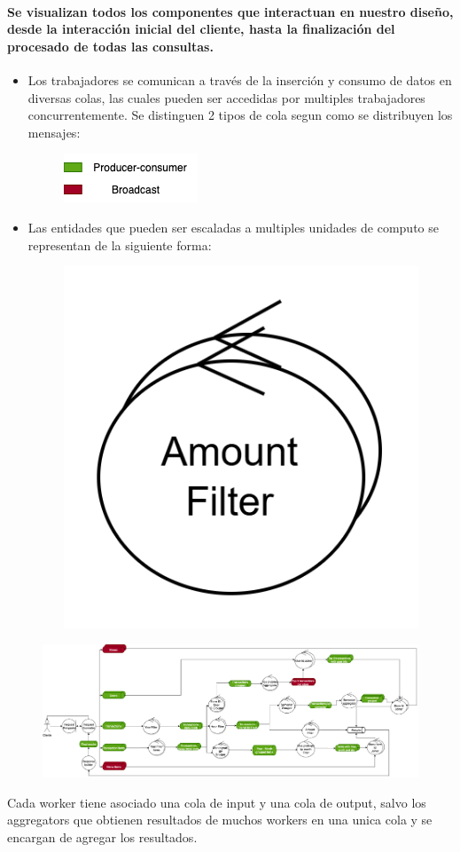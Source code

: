 \documentclass[titlepage,a4paper]{article}
\begin{document}
\paragraph{Se visualizan todos los componentes que interactuan en nuestro diseño, desde la interacción inicial del cliente, hasta la finalización del procesado de todas las consultas.}
\begin{itemize}
    \item Los trabajadores se comunican a través de la inserción y consumo de datos en diversas colas, las cuales pueden ser accedidas por multiples trabajadores concurrentemente. Se distinguen 2 tipos de cola segun como se distribuyen los mensajes:
\begin{figure}[H]
\centering
    \includegraphics[width=0.30\linewidth]{colas.png}
\end{figure}
\end{itemize}
\begin{itemize}
    \item Las entidades que pueden ser escaladas a multiples unidades de computo se representan de la siguiente forma:
\begin{figure}[H]
\centering
    \includegraphics[width=0.15\linewidth]{multiple_computo.png}
\end{figure}
\end{itemize}
\begin{figure}[H]
	\centering
	\includegraphics[width=1.0\textwidth]{robustez.png}
\end{figure}

Cada worker tiene asociado una cola de input y una cola de output, salvo los aggregators que obtienen resultados de muchos workers en una unica cola y se encargan de agregar los resultados.
\end{document}
